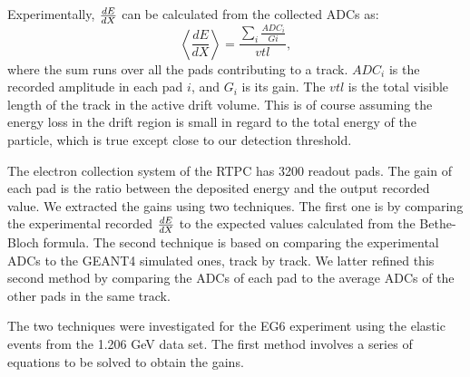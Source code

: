 Experimentally, $\small{\frac{dE}{dX}}$ can be calculated from the collected ADCs as: 
\begin{equation}
 \left\langle \frac{dE}{dX} \right\rangle= \frac{\sum\limits_{i} \frac{ADC_{i}}{Gi}}{vtl},
\end{equation}
where the sum runs over all the pads contributing to a track. $ADC_{i}$ is the 
recorded amplitude in each pad $i$, and $G_{i}$ is its gain. The $vtl$ is the 
total visible length of the track in the active drift volume. This is of course 
assuming the energy loss in the drift region is small in regard to the total 
energy of the particle, which is true except close to our detection 
threshold.

The electron collection system of the RTPC has 3200 readout pads. The gain of 
each pad is the ratio between the deposited energy and the output recorded 
value. We extracted the gains using two techniques. The first one is by 
comparing the experimental recorded $\small{\frac{dE}{dX}}$ to the expected 
values calculated from the Bethe-Bloch formula. The second technique is based 
on comparing the experimental ADCs to the GEANT4 simulated ones, track by 
track. We latter refined this second method by comparing the ADCs of each pad 
to the average ADCs of the other pads in the same track.

The two techniques were investigated for the EG6 experiment using the elastic 
events from the 1.206 GeV data set. The first method involves a series of 
equations to be solved to obtain the gains.
 
